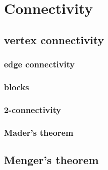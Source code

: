 \documentclass[main]{subfiles}
\begin{document}

\section{Connectivity}

\subsection{vertex connectivity}

\subsubsection{edge connectivity}

\subsubsection{blocks}

\subsubsection{2-connectivity}

\subsubsection{Mader's theorem}

\subsection{Menger's theorem}

\end{document}
